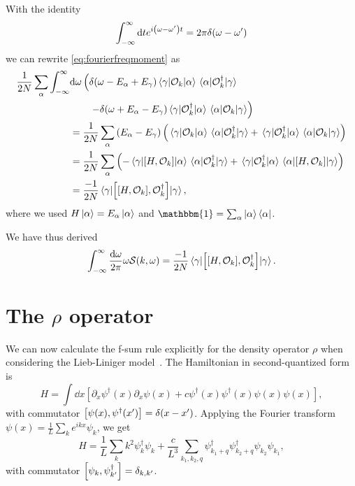 \documentclass[11pt, a4paper]{report} %
\begin{document}
With the identity
\begin{equation}
  \int_{-\infty}^{\infty} \dd t e^{i\qty(\omega-\omega')t} = 2\pi \delta(\omega-\omega')
\end{equation}
we can rewrite \cref{eq:fourierfreqmoment} as 
\begin{align}
  \frac{1}{2N} \sum_{\alpha} \int_{-\infty}^{\infty}&\dd \omega  \left(\delta\qty(\omega-E_{\alpha}+E_{\gamma})\matrixel{\gamma}{\mathcal{O}_k}{\alpha}\matrixel{\alpha}{\mathcal{O}_{k}^{\dagger}}{\gamma}\right. \nonumber\\
&\qquad\left.- \delta\qty(\omega+E_{\alpha}-E_{\gamma})\matrixel{\gamma}{\mathcal{O}_{k}^{\dagger}}{\alpha}\matrixel{\alpha}{\mathcal{O}_k}{\gamma}\right)\\
&=\frac{1}{2N} \sum_{\alpha} \qty(E_{\alpha} - E_{\gamma}) \left(\matrixel{\gamma}{\mathcal{O}_k}{\alpha}\matrixel{\alpha}{\mathcal{O}_{k}^{\dagger}}{\gamma} + \matrixel{\gamma}{\mathcal{O}_{k}^{\dagger}}{\alpha}\matrixel{\alpha}{\mathcal{O}_k}{\gamma}\right)\\
&=\frac{1}{2N} \sum_{\alpha}  \left(-\matrixel{\gamma}{[H,\mathcal{O}_k]}{\alpha}\matrixel{\alpha}{\mathcal{O}_{k}^{\dagger}}{\gamma} + \matrixel{\gamma}{\mathcal{O}_{k}^{\dagger}}{\alpha}\matrixel{\alpha}{\qty[H,\mathcal{O}_k]}{\gamma}\right)\\
&=\frac{-1}{2N} \matrixel{\gamma}{\qty[\qty[H,\mathcal{O}_k],\mathcal{O}_{k}^{\dagger}]}{\gamma},
\end{align}
where we used \(H\ket{\alpha}=E_{\alpha}\ket{\alpha}\) and \(\mathbbm{1}=\sum_{\alpha}\ket{\alpha}\bra{\alpha}\).

We have thus derived~\cite{Cauxfsum}
\begin{align}
  \int_{-\infty}^{\infty}\frac{\dd \omega}{2\pi} \omega \mathcal{S}(k,\omega) = \frac{-1}{2N} \matrixel{\gamma}{\qty[\qty[H,\mathcal{O}_k],\mathcal{O}_{k}^{\dagger}]}{\gamma}.
\end{align}


\section{The $\rho$ operator}

\begin{sloppypar}
We can now calculate the f-sum rule explicitly for the density operator \(\rho\) when considering the Lieb-Liniger model~\cite{Cauxfsum}.
The Hamiltonian in second-quantized form is~\cite{Franchini2017} 
\begin{equation}
  \label{eq:1}
  H = \int \dd x \left[\partial_x\psi^{\dag}(x) \partial_{x} \psi(x) + c \psi^{\dag}(x)\psi^{\dag}(x)\psi(x)\psi(x)\right],
\end{equation}
with commutator \(\qty[\psi(x), \psi^{\dagger}(x')] = \delta\qty(x-x')\).
Applying the Fourier transform \(\psi (x) = \frac{1}{L}\sum_{k} e^{ikx}\psi_k\), we get
\begin{equation}
  \label{eq:2}
  H = \frac{1}{L} \sum_k k^2 \psi^{\dagger}_{k}\psi_k +\frac{c}{L^3} \sum_{k_1,k_2,q} \psi^{\dag}_{k_1+q} \psi^{\dag}_{k_2+q} \psi_{k_2} \psi_{k_1},
\end{equation}
with commutator \(\qty[\psi_k,\psi_{k'}^{\dag}]=\delta_{k,k'}\).
\end{sloppypar}
\end{document}

